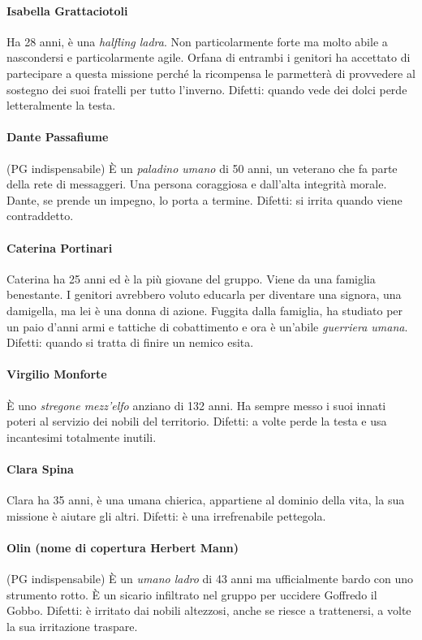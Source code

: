 \documentclass[letterpaper,twocolumn,openany,nodeprecatedcode]{dndbook}
\begin{document}
\paragraph{Isabella Grattaciotoli} Ha 28 anni, è una \textit{halfling ladra}. Non particolarmente forte ma molto abile a nascondersi e particolarmente agile. Orfana di entrambi i genitori ha accettato di partecipare a questa missione perché la ricompensa le parmetterà di provvedere al sostegno dei suoi fratelli per tutto l'inverno. Difetti: quando vede dei dolci perde letteralmente la testa.

\paragraph{Dante Passafiume} (PG indispensabile) È un \textit{paladino umano} di 50 anni, un veterano che fa parte della rete di messaggeri. Una persona coraggiosa e dall'alta integrità morale. Dante, se prende un impegno, lo porta a termine. Difetti: si irrita quando viene contraddetto.

\paragraph{Caterina Portinari} Caterina ha 25 anni ed è la più giovane del gruppo. Viene da una famiglia benestante. I genitori avrebbero voluto educarla per diventare una signora, una damigella, ma lei è una donna di azione. Fuggita dalla famiglia, ha studiato per un paio d'anni armi e tattiche di cobattimento e ora è un'abile \textit{guerriera umana}. Difetti: quando si tratta di finire un nemico esita.

\paragraph{Virgilio Monforte} È uno \textit{stregone mezz'elfo} anziano di 132 anni. Ha sempre messo i suoi innati poteri al servizio dei nobili del territorio. Difetti: a volte perde la testa e usa incantesimi totalmente inutili.

\paragraph{Clara Spina} Clara ha 35 anni, è una umana chierica, appartiene al dominio della vita, la sua missione è aiutare gli altri. Difetti: è una irrefrenabile pettegola.

\paragraph{Olin (nome di copertura Herbert Mann)} (PG indispensabile) È un \textit{umano ladro} di 43 anni ma ufficialmente bardo con uno strumento rotto. È un sicario infiltrato nel gruppo per uccidere Goffredo il Gobbo. Difetti: è irritato dai nobili altezzosi, anche se riesce a trattenersi, a volte la sua irritazione traspare.
\end{document}
